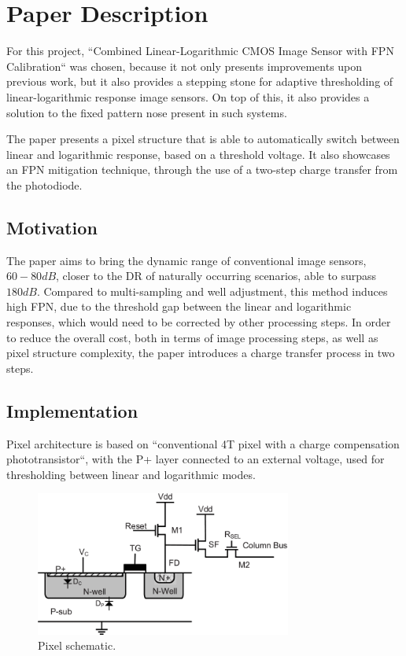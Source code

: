 \section{Paper Description}

For this project, ``Combined Linear-Logarithmic CMOS Image Sensor with FPN Calibration`` was chosen, because it
not only presents improvements upon previous work, but it also provides a stepping stone for adaptive thresholding
of linear-logarithmic response image sensors. On top of this, it also provides a solution to the fixed pattern
nose present in such systems.

The paper presents a pixel structure that is able to automatically switch between linear and logarithmic response,
based on a threshold voltage. It also showcases an FPN mitigation technique, through the use of a two-step charge
transfer from the photodiode. \cite{withTable}

\subsection{Motivation}

The paper aims to bring the dynamic range of conventional image sensors, \(60-80 dB\), closer to the DR of naturally
occurring scenarios, able to surpass \(180 dB\). Compared to multi-sampling and well adjustment, this method induces
high FPN, due to the threshold gap between the linear and logarithmic responses, which would need to be corrected
by other processing steps. In order to reduce the overall cost, both in terms of image processing steps, as well as
pixel structure complexity, the paper introduces a charge transfer process in two steps. \cite{withTable}

\subsection{Implementation}

Pixel architecture is based on ``conventional 4T pixel with a charge compensation phototransistor``, with the P+
layer connected to an external voltage, used for thresholding between linear and logarithmic modes.

\begin{figure}[H]
    \includegraphics[width=0.75\textwidth, height=0.50\textwidth]{resources/png/mainCircuit.png}
    \caption{Pixel schematic. \cite{withTable} \label{figPixelCircuit}}
\end{figure}

